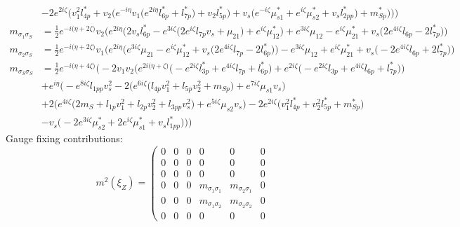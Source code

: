 \begin{itemize}
\begin{align}
 &-2 e^{2 i \zeta } \Big(v_{1}^{2} l_{4p}^*  + v_2 \Big(e^{-i \eta } v_1 \Big(e^{2 i \eta } l_{6p}^*  + l_{7p}^*\Big) + v_2 l_{5p}^* \Big) + v_s \Big(e^{-i \zeta } \mu_{s1}^*  + e^{i \zeta } \mu_{s2}^*  + v_s l_{2pp}^* \Big) + m_{Sp}^*\Big)\Big)\Big)\\ 
m_{\sigma_1\sigma_S} &= \frac{1}{2} e^{-i \Big(\eta +2 \zeta \Big)} v_2 \Big(e^{2 i \eta } \Big(2 v_s l_{6p}^*  - e^{3 i \zeta } \Big(2 e^{i \zeta } l_{7p} v_s  + \mu_{21}\Big) + e^{i \zeta } \mu_{12}^* \Big) + e^{3 i \zeta } \mu_{12}  - e^{i \zeta } \mu_{21}^*  + v_s \Big(2 e^{4 i \zeta } l_{6p}  -2 l_{7p}^* \Big)\Big)\\ 
m_{\sigma_2\sigma_S} &= \frac{1}{2} e^{-i \Big(\eta +2 \zeta \Big)} v_1 \Big(e^{2 i \eta } \Big(e^{3 i \zeta } \mu_{21}  - e^{i \zeta } \mu_{12}^*  + v_s \Big(2 e^{4 i \zeta } l_{7p}  -2 l_{6p}^* \Big)\Big) - e^{3 i \zeta } \mu_{12}  + e^{i \zeta } \mu_{21}^*  + v_s \Big(-2 e^{4 i \zeta } l_{6p}  + 2 l_{7p}^* \Big)\Big)\\ 
m_{\sigma_S\sigma_S} &= \frac{1}{2} e^{-i \Big(\eta +4 \zeta \Big)} \Big(-2 v_1 v_2 \Big(e^{2 i \Big(\eta +\zeta \Big)} \Big(- e^{2 i \zeta } l_{3p}^*  + e^{4 i \zeta } l_{7p}  + l_{6p}^*\Big) + e^{2 i \zeta } \Big(- e^{2 i \zeta } l_{3p}  + e^{4 i \zeta } l_{6p}  + l_{7p}^*\Big)\Big)\nonumber \\ 
 &+e^{i \eta } \Big(- e^{8 i \zeta } l_{1pp} v_{s}^{2} -2 \Big(e^{6 i \zeta } \Big(l_{4p} v_{1}^{2}  + l_{5p} v_{2}^{2}  + m_{Sp}\Big) + e^{7 i \zeta } \mu_{s1} v_s \Big)\nonumber \\ 
 &+2 \Big(e^{4 i \zeta } \Big(2 m_{S}  + l_{1p} v_{1}^{2}  + l_{2p} v_{2}^{2}  + l_{3pp} v_{s}^{2} \Big) + e^{5 i \zeta } \mu_{s2} v_s \Big)-2 e^{2 i \zeta } \Big(v_{1}^{2} l_{4p}^*  + v_{2}^{2} l_{5p}^*  + m_{Sp}^*\Big)\nonumber \\ 
 &- v_s \Big(-2 e^{3 i \zeta } \mu_{s2}^*  + 2 e^{i \zeta } \mu_{s1}^*  + v_s l_{1pp}^* \Big)\Big)\Big)
\end{align} 
Gauge fixing contributions: 
\begin{equation} 
m^2 (\xi_{Z}) = \left( 
\begin{array}{cccccc}
0 &0 &0 &0 &0 &0\\ 
0 &0 &0 &0 &0 &0\\ 
0 &0 &0 &0 &0 &0\\ 
0 &0 &0 &m_{\sigma_1\sigma_1} &m_{\sigma_2\sigma_1} &0\\ 
0 &0 &0 &m_{\sigma_1\sigma_2} &m_{\sigma_2\sigma_2} &0\\ 
0 &0 &0 &0 &0 &0\end{array} 

\end{equation}
\end{itemize}
